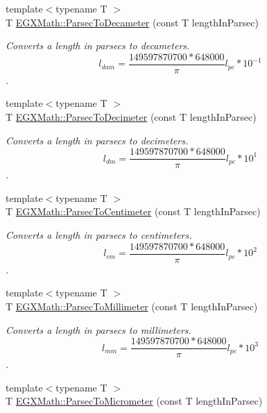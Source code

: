 \begin{DoxyCompactItemize}
{\footnotesize template$<$typename T $>$ }\\T \mbox{\hyperlink{group___e_g_x_math-_conversions-_length_conversions-_astronomical-_parsec-_s_i_ga69437b0eb33c7cd5df74e32993f9b1e0}{E\+G\+X\+Math\+::\+Parsec\+To\+Decameter}} (const T length\+In\+Parsec)
\begin{DoxyCompactList}\small\item\em Converts a length in parsecs to decameters. \[ l_{dam}=\frac{149597870700 * 648000}{\pi}l_{pc} * 10^{-1} \]. \end{DoxyCompactList}\item 
{\footnotesize template$<$typename T $>$ }\\T \mbox{\hyperlink{group___e_g_x_math-_conversions-_length_conversions-_astronomical-_parsec-_s_i_gaedc7b871291866977df575d69f7eaf6f}{E\+G\+X\+Math\+::\+Parsec\+To\+Decimeter}} (const T length\+In\+Parsec)
\begin{DoxyCompactList}\small\item\em Converts a length in parsecs to decimeters. \[ l_{dm}=\frac{149597870700 * 648000}{\pi}l_{pc} * 10^{1} \]. \end{DoxyCompactList}\item 
{\footnotesize template$<$typename T $>$ }\\T \mbox{\hyperlink{group___e_g_x_math-_conversions-_length_conversions-_astronomical-_parsec-_s_i_ga87c7cdc557184f0451717a0bf04e9d38}{E\+G\+X\+Math\+::\+Parsec\+To\+Centimeter}} (const T length\+In\+Parsec)
\begin{DoxyCompactList}\small\item\em Converts a length in parsecs to centimeters. \[ l_{cm}=\frac{149597870700 * 648000}{\pi}l_{pc} * 10^{2} \]. \end{DoxyCompactList}\item 
{\footnotesize template$<$typename T $>$ }\\T \mbox{\hyperlink{group___e_g_x_math-_conversions-_length_conversions-_astronomical-_parsec-_s_i_ga5ea5a5b0860b6c6ad260425079db2ee2}{E\+G\+X\+Math\+::\+Parsec\+To\+Millimeter}} (const T length\+In\+Parsec)
\begin{DoxyCompactList}\small\item\em Converts a length in parsecs to millimeters. \[ l_{mm}=\frac{149597870700 * 648000}{\pi}l_{pc} * 10^{3} \]. \end{DoxyCompactList}\item 
{\footnotesize template$<$typename T $>$ }\\T \mbox{\hyperlink{group___e_g_x_math-_conversions-_length_conversions-_astronomical-_parsec-_s_i_ga1eea34f6cb4b5a7b5dec1cd75863f191}{E\+G\+X\+Math\+::\+Parsec\+To\+Micrometer}} (const T length\+In\+Parsec)

\end{DoxyCompactItemize}
